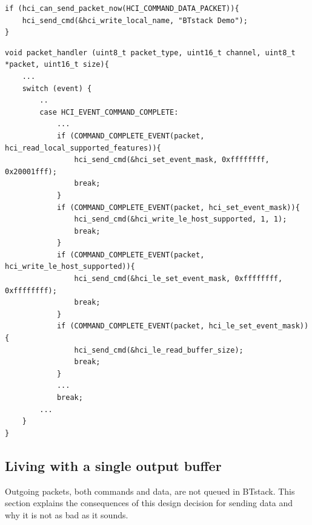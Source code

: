 \documentclass[a4paper,titlepage,oneside,12pt]{amsart} %
\begin{document}
\begin{lstlisting}[caption= Send hci\_write\_local\_name command that takes a string as a parameter., label=HCIcmdExampleLocalName]
if (hci_can_send_packet_now(HCI_COMMAND_DATA_PACKET)){
    hci_send_cmd(&hci_write_local_name, "BTstack Demo");
}  
\end{lstlisting}

\noindent\begin{minipage}{\textwidth}
\begin{lstlisting}[caption=Example of sending a sequence of HCI Commands,label=HCIcmdsExample]
void packet_handler (uint8_t packet_type, uint16_t channel, uint8_t *packet, uint16_t size){
    ...
    switch (event) {
        .. 
        case HCI_EVENT_COMMAND_COMPLETE:
            ...
            if (COMMAND_COMPLETE_EVENT(packet, hci_read_local_supported_features)){
                hci_send_cmd(&hci_set_event_mask, 0xffffffff, 0x20001fff);
                break;
            }
            if (COMMAND_COMPLETE_EVENT(packet, hci_set_event_mask)){
                hci_send_cmd(&hci_write_le_host_supported, 1, 1);
                break;
            }
            if (COMMAND_COMPLETE_EVENT(packet, hci_write_le_host_supported)){
                hci_send_cmd(&hci_le_set_event_mask, 0xffffffff, 0xffffffff);
                break;
            }
            if (COMMAND_COMPLETE_EVENT(packet, hci_le_set_event_mask)){
                hci_send_cmd(&hci_le_read_buffer_size);
                break;
            }
            ...
            break;
        ...
    }
}
\end{lstlisting}
\end{minipage}

\subsection{Living with a single output buffer}
\label{section:single_buffer}
Outgoing packets, both commands and data, are not queued in BTstack. This section explains the consequences of this design decision for sending data and why it is not as bad as it sounds.
\end{document}
